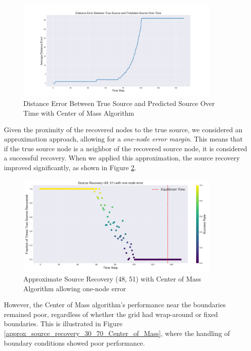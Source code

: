 \begin{figure}[H]
\centering
\includegraphics[width=0.9\textwidth]{img/Distance_Error_True_Predicted_Source_Center_Mass.png}
\caption{Distance Error Between True Source and Predicted Source Over Time with Center of Mass Algorithm}
\label{Distance_Error_True_Predicted_Source_Center_Mass}
\end{figure}

Given the proximity of the recovered nodes to the true source, we considered an approximation approach, allowing for a \textit{one-node error margin}. This means that if the true source node is a neighbor of the recovered source node, it is considered a successful recovery. When we applied this approximation, the source recovery improved significantly, as shown in Figure \ref{approx_source_recovery_48_51_Center_of_Mass}.

\begin{figure}[H]
\centering
\includegraphics[width=0.9\textwidth]{img/approx_source_recovery_48_51_Center_of_Mass.png}
\caption{Approximate Source Recovery (48, 51) with Center of Mass Algorithm allowing one-node error}
\label{approx_source_recovery_48_51_Center_of_Mass}
\end{figure}

However, the Center of Mass algorithm's performance near the boundaries remained poor, regardless of whether the grid had wrap-around or fixed boundaries. This is illustrated in Figure \ref{approx_source_recovery_30_70_Center_of_Mass}, where the handling of boundary conditions showed poor performance.

